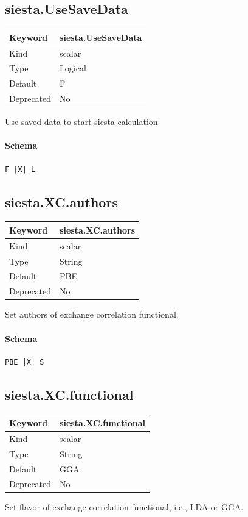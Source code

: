 \documentclass[11pt]{article}
\begin{document}
{{{{{\subsection{siesta.UseSaveData}
\label{kw:siesta-UseSaveData}
\begin{longtable}{|p{1.5in}|p{4.5in}|}
\hline
Keyword & siesta.UseSaveData \\
\hline
Kind & scalar \\
\hline
Type & Logical \\
\hline
Default & F \\
\hline
Deprecated & No \\
\hline
\end{longtable}
 Use saved data to start siesta calculation

\paragraph{Schema}
\begin{Verbatim}
F |X| L
\end{Verbatim}

\subsection{siesta.XC.authors}
\label{kw:siesta-XC-authors}
\begin{longtable}{|p{1.5in}|p{4.5in}|}
\hline
Keyword & siesta.XC.authors \\
\hline
Kind & scalar \\
\hline
Type & String \\
\hline
Default & PBE \\
\hline
Deprecated & No \\
\hline
\end{longtable}
 Set authors of exchange correlation functional.

\paragraph{Schema}
\begin{Verbatim}
PBE |X| S
\end{Verbatim}

\subsection{siesta.XC.functional}
\label{kw:siesta-XC-functional}
\begin{longtable}{|p{1.5in}|p{4.5in}|}
\hline
Keyword & siesta.XC.functional \\
\hline
Kind & scalar \\
\hline
Type & String \\
\hline
Default & GGA \\
\hline
Deprecated & No \\
\hline
\end{longtable}
 Set flavor of exchange-correlation functional, i.e., LDA or GGA.

}}}}}
\end{document}
